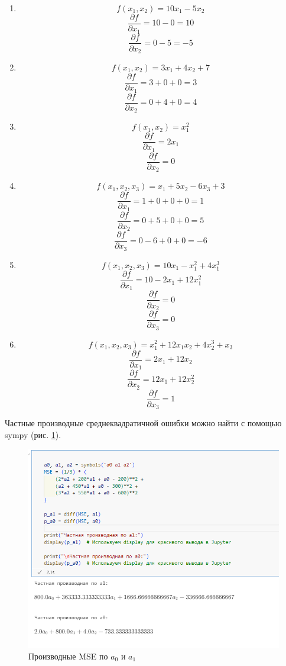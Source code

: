 \documentclass[14pt,a4paper]{extarticle}
\begin{document}
\begin{enumerate}
    \item 
    \[
    f(x_1, x_2) = 10x_1 - 5x_2
    \]
    \[
    \frac{\partial f}{\partial x_1} = 10 - 0 = 10
    \]
    \[
    \frac{\partial f}{\partial x_2} = 0 - 5 = -5
    \]

    \item 
    \[
    f(x_1, x_2) = 3x_1 + 4x_2 + 7
    \]
    \[
    \frac{\partial f}{\partial x_1} = 3 + 0 + 0 = 3
    \]
    \[
    \frac{\partial f}{\partial x_2} = 0 + 4 + 0 = 4
    \]

    \item 
    \[
    f(x_1, x_2) = x_1^2
    \]
    \[
    \frac{\partial f}{\partial x_1} = 2x_1
    \]
    \[
    \frac{\partial f}{\partial x_2} = 0
    \]

    \item 
    \[
    f(x_1, x_2, x_3) = x_1 + 5x_2 - 6x_3 + 3
    \]
    \[
    \frac{\partial f}{\partial x_1} = 1 + 0 + 0 + 0 = 1
    \]
    \[
    \frac{\partial f}{\partial x_2} = 0 + 5 + 0 + 0 = 5
    \]
    \[
    \frac{\partial f}{\partial x_3} = 0 - 6 + 0 + 0 = -6
    \]

    \item 
    \[
    f(x_1, x_2, x_3) = 10x_1 - x_1^2 + 4x_1^3
    \]
    \[
    \frac{\partial f}{\partial x_1} = 10 - 2x_1 + 12x_1^2
    \]
    \[
    \frac{\partial f}{\partial x_2} = 0
    \]
    \[
    \frac{\partial f}{\partial x_3} = 0
    \]

    \item 
    \[
    f(x_1, x_2, x_3) = x_1^2 + 12x_1x_2 + 4x_2^3 + x_3
    \]
    \[
    \frac{\partial f}{\partial x_1} = 2x_1 + 12x_2
    \]
    \[
    \frac{\partial f}{\partial x_2} = 12x_1 + 12x_2^2
    \]
    \[
    \frac{\partial f}{\partial x_3} = 1
    \]
\end{enumerate}

Частные производные среднеквадратичной ошибки можно найти с помощью sympy (рис. \ref{pic:mse}).

\begin{figure}[h!]
    \centering
    \includegraphics[scale=0.9]{pic6/3.png}
    \caption{Производные MSE по $a_0$ и $a_1$}
    \label{pic:mse}
\end{figure}
\FloatBarrier
\end{document}
